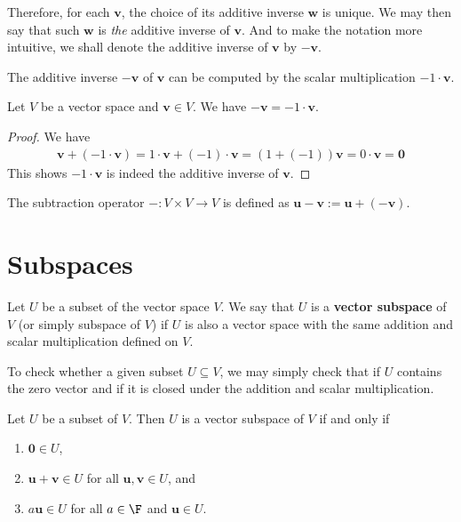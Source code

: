 \documentclass[thmcnt=section, color=cyan, 12pt]{my-elegantbook}
\begin{document}
Therefore, for each $\mathbf{v}$, the choice of its
additive inverse $\mathbf{w}$ is unique.
We may then say that such $\mathbf{w}$ is \textit{the} additive inverse of $\mathbf{v}$.
And to make the notation more intuitive, we shall denote
the additive inverse of $\mathbf{v}$ by $-\mathbf{v}$.

The additive inverse $-\mathbf{v}$ of $\mathbf{v}$ can be computed by
the scalar multiplication $-1 \cdot \mathbf{v}$.

\begin{proposition}
	Let $V$ be a vector space and $\mathbf{v} \in V$.
	We have $-\mathbf{v} = -1 \cdot \mathbf{v}$.
\end{proposition}

\begin{proof}
	We have
	\begin{align*}
		\mathbf{v} + (-1 \cdot \mathbf{v}) = 1 \cdot \mathbf{v} + (-1) \cdot \mathbf{v}
		= (1 + (-1)) \mathbf{v}
		= 0 \cdot \mathbf{v}
		= \mathbf{0}
	\end{align*}
	This shows $-1 \cdot \mathbf{v}$ is indeed the additive inverse of $\mathbf{v}$.
\end{proof}

The subtraction operator $-: V \times V \to V$ is defined
as $\mathbf{u} - \mathbf{v} := \mathbf{u} + (-\mathbf{v})$.


\section{Subspaces}

Let $U$ be a subset of the vector space $V$.
We say that $U$ is a \textbf{vector subspace} of $V$
(or simply subspace of $V$)
if $U$ is also a vector space with the same addition and scalar multiplication
defined on $V$.

To check whether a given subset $U \subseteq V$,
we may simply check that if $U$ contains the zero vector
and if it is closed under
the addition and scalar multiplication.

\begin{proposition}
	Let $U$ be a subset of $V$.
	Then $U$ is a vector subspace of $V$ if and only if
	\begin{enumerate}
		\item $\mathbf{0} \in U$,
		\item $\mathbf{u} + \mathbf{v} \in U$ for all $\mathbf{u}, \mathbf{v} \in U$, and
		\item $a \mathbf{u} \in U$ for all $a \in \F$ and $\mathbf{u} \in U$.
	\end{enumerate}
\end{proposition}
\end{document}
